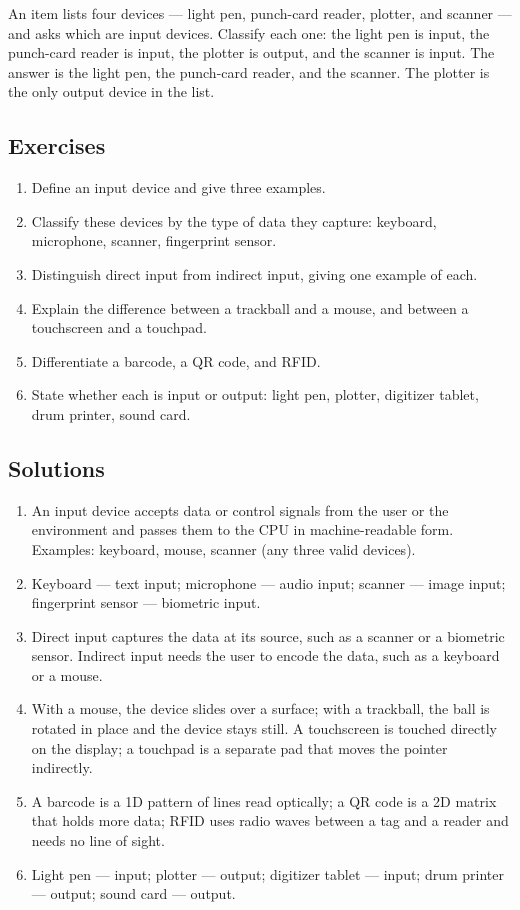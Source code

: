 \begin{example}
An item lists four devices --- light pen, punch-card reader, plotter, and
scanner --- and asks which are input devices. Classify each one: the light
pen is input, the punch-card reader is input, the plotter is output, and the
scanner is input. The answer is the light pen, the punch-card reader, and the
scanner. The plotter is the only output device in the list.
\end{example}

\subsection*{Exercises}
\begin{enumerate}[label=\arabic*.]
  \item Define an input device and give three examples.
  \item Classify these devices by the type of data they capture: keyboard,
    microphone, scanner, fingerprint sensor.
  \item Distinguish direct input from indirect input, giving one example of
    each.
  \item Explain the difference between a trackball and a mouse, and between a
    touchscreen and a touchpad.
  \item Differentiate a barcode, a QR code, and RFID.
  \item State whether each is input or output: light pen, plotter, digitizer
    tablet, drum printer, sound card.
\end{enumerate}

\subsection*{Solutions}
\begingroup\small
\begin{enumerate}[label=\arabic*.]
  \item An input device accepts data or control signals from the user or the
    environment and passes them to the CPU in machine-readable form.
    Examples: keyboard, mouse, scanner (any three valid devices).
  \item Keyboard --- text input; microphone --- audio input; scanner ---
    image input; fingerprint sensor --- biometric input.
  \item Direct input captures the data at its source, such as a scanner or a
    biometric sensor. Indirect input needs the user to encode the data, such
    as a keyboard or a mouse.
  \item With a mouse, the device slides over a surface; with a trackball, the
    ball is rotated in place and the device stays still. A touchscreen is
    touched directly on the display; a touchpad is a separate pad that moves
    the pointer indirectly.
  \item A barcode is a 1D pattern of lines read optically; a QR code is a 2D
    matrix that holds more data; RFID uses radio waves between a tag and a
    reader and needs no line of sight.
  \item Light pen --- input; plotter --- output; digitizer tablet --- input;
    drum printer --- output; sound card --- output.
\end{enumerate}
\endgroup

